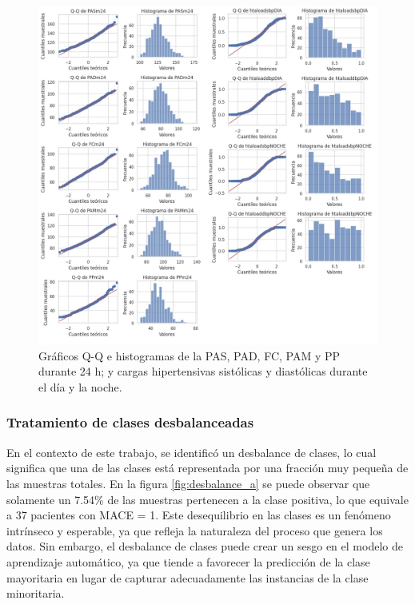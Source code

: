 \begin{figure}[ht]
	\centering
	\includegraphics[width=\textwidth]{./Figures/qqplots.jpg}
	\caption{Gráficos Q-Q e histogramas de la PAS, PAD, FC, PAM y PP durante 24 h; y cargas hipertensivas sistólicas y diastólicas durante el día y la noche.}\label{fig:qqplots}
\end{figure}


\subsubsection{Tratamiento de clases desbalanceadas }
En el contexto de este trabajo, se identificó un desbalance de clases, lo cual significa que una de las clases 
está representada por una fracción muy pequeña de las muestras totales. En la figura \ref{fig:desbalance_a} se puede 
observar que solamente un 7.54\% de las muestras pertenecen a la clase positiva, lo que equivale a 37 pacientes con MACE = 1. 
Este desequilibrio en las clases es un fenómeno intrínseco y esperable, ya que refleja la naturaleza del proceso 
que genera los datos. Sin embargo, el desbalance de clases puede crear un sesgo en el modelo de aprendizaje 
automático, ya que tiende a favorecer la predicción de la clase mayoritaria en lugar de capturar adecuadamente 
las instancias de la clase minoritaria. 

